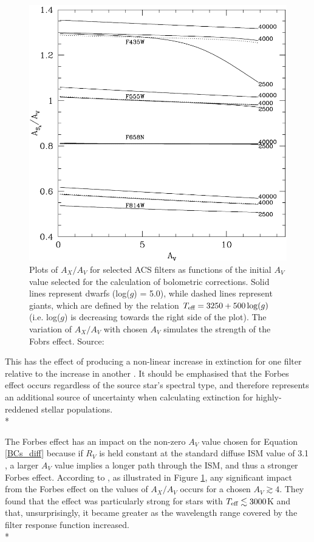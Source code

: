 \documentclass[12pt, a4paper]{report}
\begin{document}
\begin{figure}[h!]
\begin{center}
\includegraphics[width=1.0\textwidth]{girardi_forbes_effect_figure.png}
\caption{Plots of $A_{X}/A_{V}$ for selected ACS filters as functions of the initial $A_{V}$ value selected for the calculation of bolometric corrections. Solid lines represent dwarfs (log($g$) = 5.0), while dashed lines represent giants, which are defined by the relation $T_{\textnormal{eff}} = 3250 + 500\log(g)$ (i.e. log($g$) is decreasing towards the right side of the plot). The variation of $A_{X}/A_{V}$ with chosen $A_{V}$ simulates the  strength of the Fobrs effect. Source: \cite{2008PASP..120..583G}}
\end{center}
\label{girardi_forbes}
\end{figure}

This has the effect of producing a non-linear increase in extinction for one filter relative to the increase in another \citep{1995A&AS..109..293G,2008PASP..120..583G}. It should be emphasised that the Forbes effect occurs regardless of the source star's spectral type, and therefore represents an additional source of uncertainty when calculating extinction for highly-reddened stellar populations. \\*

The Forbes effect has an impact on the non-zero $A_{V}$ value chosen for Equation \ref{BCs_diff} because if $R_{V}$ is held constant at the standard diffuse ISM value of 3.1 \citep{1989ApJ...345..245C}, a larger $A_{V}$ value implies a longer path through the ISM, and thus a stronger Forbes effect. According to \cite{2008PASP..120..583G}, as illustrated in Figure \ref{girardi_forbes}, any significant impact from the Forbes effect on the values of $A_{X}/A_{V}$ occurs for a chosen $A_{V} \gtrsim 4$. They found that the effect was particularly strong for stars with $T_{\textnormal{eff}} \lesssim 3000$K and that, unsurprisingly, it became greater as the wavelength range covered by the filter response function increased.\\*
\end{document}
